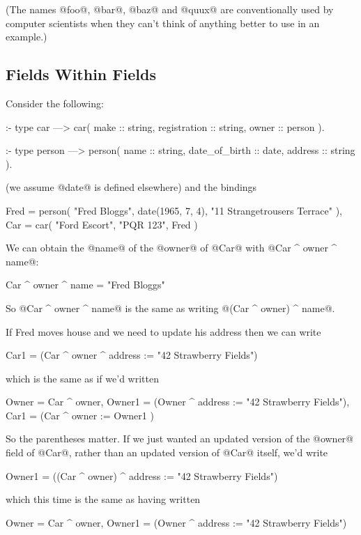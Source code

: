 (The names @foo@, @bar@, @baz@ and @quux@ are conventionally used by
computer scientists when they can't think of anything better to use in an
example.)

\subsection{Fields Within Fields}

Consider the following:
\begin{myverbatim}
:- type car
    --->    car(
                make            :: string,
                registration    :: string,
                owner           :: person
            ).

:- type person
    --->    person(
                name            :: string,
                date_of_birth   :: date,
                address         :: string
            ).
\end{myverbatim}
(we assume @date@ is defined elsewhere) and the bindings
\begin{myverbatim}
    Fred = person(
               "Fred Bloggs",
               date(1965, 7, 4),
               "11 Strangetrousers Terrace"
           ),
    Car  = car( 
               "Ford Escort",
               "PQR 123",
               Fred
           )
\end{myverbatim}
We can obtain the @name@ of the @owner@ of @Car@ with
@Car ^ owner ^ name@:
\begin{myverbatim}
    Car ^ owner ^ name = "Fred Bloggs"
\end{myverbatim}
So @Car ^ owner ^ name@ is the same as writing @(Car ^ owner) ^ name@.

If Fred moves house and we need to update his address then we can write
\begin{myverbatim}
    Car1 = (Car ^ owner ^ address := "42 Strawberry Fields")
\end{myverbatim}
which is the same as if we'd written
\begin{myverbatim}
    Owner  = Car ^ owner,
    Owner1 = (Owner ^ address := "42 Strawberry Fields"),
    Car1   = (Car   ^ owner   := Owner1                )
\end{myverbatim}
So the parentheses matter.  If we just wanted an updated version of the
@owner@ field of @Car@, rather than an updated version of @Car@ itself,
we'd write
\begin{myverbatim}
    Owner1 = ((Car ^ owner) ^ address := "42 Strawberry Fields")
\end{myverbatim}
which this time is the same as having written
\begin{myverbatim}
    Owner  = Car ^ owner,
    Owner1 = (Owner ^ address := "42 Strawberry Fields")
\end{myverbatim}

